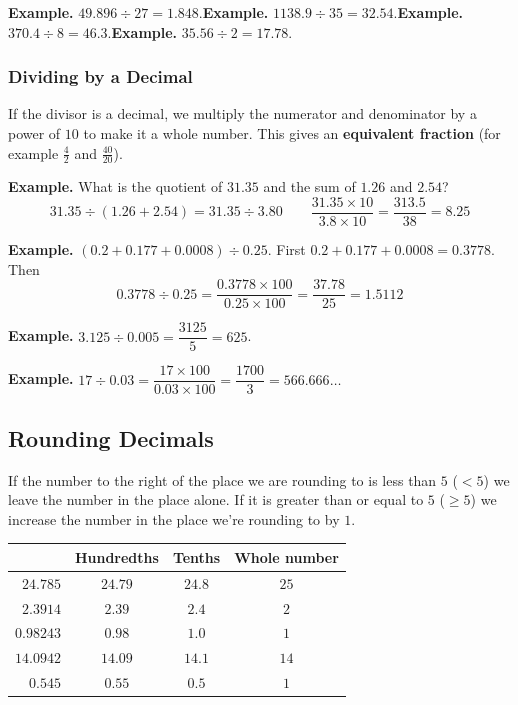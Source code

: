 \documentclass[letter]{article}
\newenvironment{keybox}
  {\begin{lrbox}{\keyboxsave}\begin{minipage}{\dimexpr\linewidth-2\fboxsep-2\fboxrule\relax}}
  {\end{minipage}\end{lrbox}\par\noindent\fbox{\usebox{\keyboxsave}}\par}
\begin{document}
\textbf{Example.} $49.896\div27=1.848$.\qquad\textbf{Example.} $1138.9\div35=32.54$.\qquad\textbf{Example.} $370.4\div8=46.3$.\qquad\textbf{Example.} $35.56\div2=17.78$.

\subsubsection*{Dividing by a Decimal}

If the divisor is a decimal, we multiply the numerator and denominator by a power of $10$ to make it a whole number. This gives an \textbf{equivalent fraction} (for example $\frac42$ and $\frac{40}{20}$).

\textbf{Example.} What is the quotient of $31.35$ and the sum of $1.26$ and $2.54$?
\[
  31.35\div(1.26+2.54)=31.35\div3.80\qquad\frac{31.35\times10}{3.8\times10}=\frac{313.5}{38}=8.25
\]

\textbf{Example.} $(0.2+0.177+0.0008)\div0.25$. First $0.2+0.177+0.0008=0.3778$. Then
\[
  0.3778\div0.25=\frac{0.3778\times100}{0.25\times100}=\frac{37.78}{25}=1.5112
\]

\textbf{Example.} $3.125\div0.005=\dfrac{3125}{5}=625$.

\textbf{Example.} $17\div0.03=\dfrac{17\times100}{0.03\times100}=\dfrac{1700}3=566.666\ldots$

\subsection{Rounding Decimals}

\begin{keybox}
If the number to the right of the place we are rounding to is less than $5$ ($<5$) we leave the number in the place alone. If it is greater than or equal to $5$ ($\geq5$) we increase the number in the place we're rounding to by $1$.
\end{keybox}

\begin{center}
\begin{tabular}{r|c|c|c}
 & Hundredths & Tenths & Whole number\\
\hline
$24.785$ & $24.79$ & $24.8$ & $25$\\
$2.3914$ & $2.39$ & $2.4$ & $2$\\
$0.98243$ & $0.98$ & $1.0$ & $1$\\
$14.0942$ & $14.09$ & $14.1$ & $14$\\
$0.545$ & $0.55$ & $0.5$ & $1$
\end{tabular}
\end{center}
\end{document}
